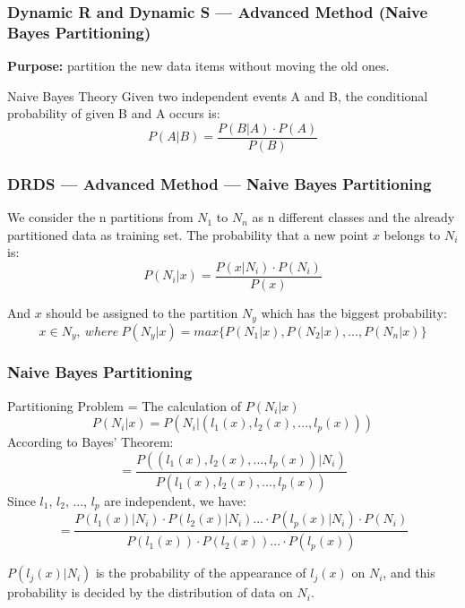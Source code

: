 \begin{frame}
\frametitle{Dynamic R and Dynamic S --- Advanced Method (Naive Bayes Partitioning)}
\textbf{Purpose: } partition the new data items without moving the old ones.
\begin{block}{Naive Bayes Theory}
Given two independent events A and B, the conditional probability of given B and A occurs is:
\begin{equation}
P(A|B) = \frac{P(B|A) \cdot P(A)}{P(B)}
\end{equation}
\end{block}
\end{frame}

\begin{frame}
\frametitle{DRDS --- Advanced Method --- Naive Bayes Partitioning}
We consider the n partitions from $N_1$ to $N_n$ as n different classes and the already partitioned data as training set. 
The probability that a new point $x$ belongs to $N_i$ is:
\begin{equation}
P(N_i | x) = \frac{P(x | N_i) \cdot P(N_i)}{P(x)}
\end{equation}

And $x$ should be assigned to the partition $N_y$ which has the biggest probability:
\begin{equation}
x \in N_y, \  where \ P(N_y|x) = max\{P(N_1|x), P(N_2|x), ..., P(N_n|x)\}
\end{equation}
\end{frame}

\begin{frame}
\frametitle{Naive Bayes Partitioning}
Partitioning Problem = The calculation of $P(N_i|x)$
\begin{equation}
P(N_i|x) = P(N_i|(l_1(x), l_2(x), ..., l_p(x)))
\end{equation}
According to Bayes' Theorem:
\begin{equation}
= \frac{P( (l_1(x), l_2(x), ..., l_p(x))|N_i )}{P(  l_1(x), l_2(x), ..., l_p(x) )}
\end{equation}
Since $l_1$, $l_2$, ..., $l_p$ are independent, we have:
\begin{equation}
= \frac{ P(l_1(x)|N_i) \cdot P( l_2(x)|N_i ) ...  \cdot P(l_p(x)|N_i)   \cdot P(N_i)}{P(l_1(x)) \cdot P(l_2(x)) ... \cdot P(l_p(x))   }
\end{equation}

$P(l_j(x)|N_i)$ is the probability of the appearance of $l_j(x)$ on $N_i$, and this probability is decided by the distribution of data on $N_i$.
\end{frame}

